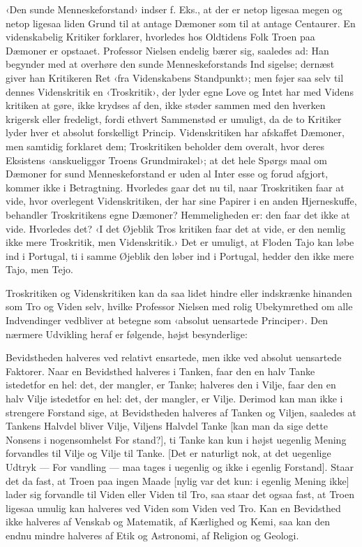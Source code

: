 \documentclass[12pt,a4paper,openany]{book}
\newcommand{\opage}[1]{\marginnote{\footnotesize\textit{[#1]}}}
\begin{document}
‹Den sunde Menneskeforstand› indser f. Eks., at der er
netop ligesaa megen og netop ligesaa liden Grund til at antage
Dæmoner som til at antage Centaurer. En videnskabelig Kritiker
forklarer, hvorledes hos Oldtidens Folk Troen paa Dæmoner er
opstaaet. Professor Nielsen endelig bærer sig, saaledes ad: Han
begynder med at overhøre den sunde Menneskeforstands Ind\-%
sigelse; dernæst giver han Kritikeren Ret ‹fra Videnskabens
Standpunkt›; men føjer saa selv til dennes Videnskritik en
‹Troskritik›, der lyder egne Love og Intet har med Videns\-%
kritiken at gøre, ikke krydses af den, ikke støder sammen med
den hverken krigersk eller fredeligt, fordi ethvert Sammenstød
er umuligt, da de to Kritiker lyder hver et absolut forskelligt
Princip. Videnskritiken har afskaffet Dæmoner, men samtidig
forklaret dem; Troskritiken beholder dem overalt, hvor deres
Eksistens ‹anskueliggør Troens Grundmirakel›; at det hele Spørgs\-%
maal om Dæmoner for sund Menneskeforstand er uden al Inter\-%
esse og forud afgjort, kommer ikke i Betragtning. Hvorledes
gaar det nu til, naar Troskritiken faar at vide, hvor overlegent
Videnskritiken, der har sine Papirer i en anden Hjerneskuffe,
behandler Troskritikens egne Dæmoner? Hemmeligheden er: den
faar det ikke at vide. Hvorledes det? ‹I det Øjeblik Tros\-%
kritiken faar det at vide, er den nemlig ikke mere Troskritik,
men Videnskritik.› Det er umuligt, at Floden Tajo kan løbe
ind i Portugal, ti i samme Øjeblik den løber ind i Portugal,
hedder den ikke mere Tajo, men Tejo.

Troskritiken og Videnskritiken kan da saa lidet hindre eller
\opage{88}indskrænke hinanden som Tro og Viden selv, hvilke Professor
Nielsen med rolig Ubekymrethed om alle Indvendinger vedbliver
at betegne som ‹absolut uensartede Principer›. Den nærmere
Udvikling heraf er følgende, højst besynderlige:

{\small
Bevidstheden halveres ved relativt ensartede, men ikke ved absolut
uensartede Faktorer. Naar en Bevidsthed halveres i Tanken, faar den en
halv Tanke istedetfor en hel: det, der mangler, er Tanke; halveres den i
Vilje, faar den en halv Vilje istedetfor en hel: det, der mangler, er Vilje.
Derimod kan man ikke i strengere Forstand sige, at Bevidstheden halveres
af Tanken og Viljen, saaledes at Tankens Halvdel bliver Vilje, Viljens
Halvdel Tanke [kan man da sige dette Nonsens i nogensomhelst For\-%
stand?], ti Tanke kan kun i højst uegenlig Mening forvandles til Vilje og
Vilje til Tanke. [Det er naturligt nok, at det uegenlige Udtryk --- For\-%
vandling --- maa tages i uegenlig og ikke i egenlig Forstand]. Staar det
da fast, at Troen paa ingen Maade [nylig var det kun: i egenlig Mening
ikke] lader sig forvandle til Viden eller Viden til Tro, saa staar det ogsaa
fast, at Troen ligesaa umulig kan halveres ved Viden som Viden ved Tro.
Kan en Bevidsthed ikke halveres af Venskab og Matematik, af Kærlighed
og Kemi, saa kan den endnu mindre halveres af Etik og Astronomi, af
Religion og Geologi.\par}
\end{document}
